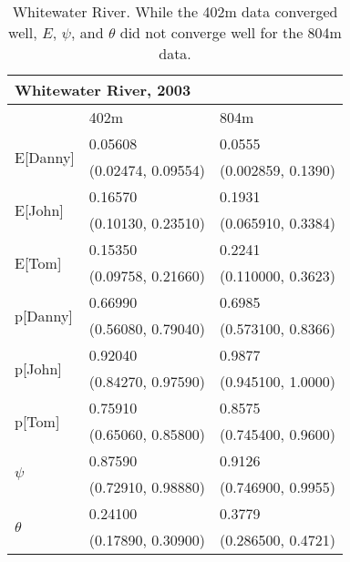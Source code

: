 \documentclass[11pt]{article}
\begin{document}
    \begin{table}
        \caption{Whitewater River. While the 402m data converged well, \(E\),
        \(\psi\), and \(\theta\) did not converge well for the 804m data.}
        \label{Whitewater}
        \begin{center}
            \begin{tabular}{|l|l|l|}
                \hline
                \multicolumn{3}{|l|}{\textbf{Whitewater River, 2003}} \\
                \hline
                    & 402m & 804m \\
                \hline
                \multirow{2}{*}{E[Danny]}
                    & 0.05608 & 0.0555 \\
                    & (0.02474, 0.09554) & (0.002859, 0.1390) \\
                \hline
                \multirow{2}{*}{E[John]}
                    & 0.16570 & 0.1931 \\
                    & (0.10130, 0.23510) & (0.065910, 0.3384) \\
                \hline
                \multirow{2}{*}{E[Tom]}
                    & 0.15350 & 0.2241 \\
                    & (0.09758, 0.21660) & (0.110000, 0.3623) \\
                \hline
                \multirow{2}{*}{p[Danny]}
                    & 0.66990 & 0.6985 \\
                    & (0.56080, 0.79040) & (0.573100, 0.8366) \\
                \hline
                \multirow{2}{*}{p[John]}
                    & 0.92040 & 0.9877 \\
                    & (0.84270, 0.97590) & (0.945100, 1.0000) \\
                \hline
                \multirow{2}{*}{p[Tom]}
                    & 0.75910 & 0.8575 \\
                    & (0.65060, 0.85800) & (0.745400, 0.9600) \\
                \hline
                \multirow{2}{*}{\(\psi\)}
                    & 0.87590 & 0.9126 \\
                    & (0.72910, 0.98880) & (0.746900, 0.9955) \\
                \hline
                \multirow{2}{*}{\(\theta\)}
                    & 0.24100 & 0.3779 \\
                    & (0.17890, 0.30900) & (0.286500, 0.4721) \\
                \hline
            \end{tabular}
        \end{center}
    \end{table}
\end{document}
